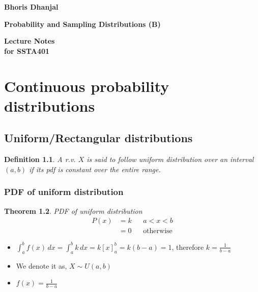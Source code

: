 \documentclass[oneside,11pt,pdftex]{book}%
\numberwithin{equation}{section}
\newtheorem{theorem}{Theorem}[chapter]%
\newtheorem{definition}[theorem]{Definition}
\numberwithin{section}{chapter}
\numberwithin{equation}{chapter}
\begin{document}
\frontmatter

\thispagestyle{empty}
\begin{flushright}
{\LARGE \textbf{Bhoris Dhanjal}}%
\end{flushright}
\vfill
\begin{center}
{\fontsize{29.86truept}{0truept}\selectfont \textbf{Probability and Sampling Distributions (B)}}%
\end{center}
\vfill
\begin{flushleft}
{\LARGE \textbf{Lecture Notes}} \\
\hspace{-1.75truept}
{\large \textbf{for SSTA401}}
\end{flushleft}
\newpage

\tableofcontents


\mainmatter

\chapter[Continuous probability distributions]{Continuous probability distributions	}
\section{Uniform/Rectangular distributions}
\begin{definition}\label{def:uniformdist}
	A r.v. $ X$ is said to follow uniform distribution over an interval $ (a,b) $ if its pdf is constant over the entire range.
\end{definition}
\subsection{PDF of uniform distribution}
\begin{theorem}
	PDF of uniform distribution
	\begin{align*}
		P(x)&=k && a<x<b\\
		&=0 && \text{otherwise}
	\end{align*}
\end{theorem}



\begin{itemize}
	\item $ \int_a^b f(x)\, dx=\int_a^b k\, dx = k[x]_a^b=k(b-a)=1$, therefore $k= \frac{1}{b-a} $
	\item We denote it as, $ X \sim U(a,b) $
	\item $ f(x)=\frac{1}{b-a} $\\ 
\end{itemize}
\end{document}
